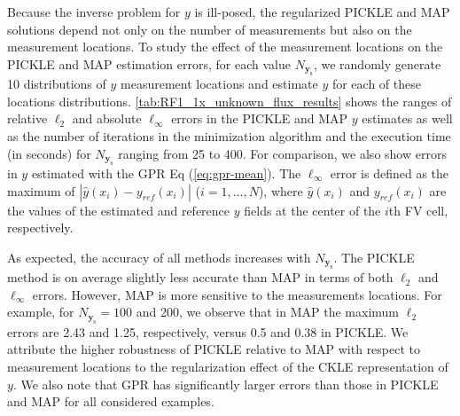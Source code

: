 \documentclass{agujournal2019}
\begin{document}
Because the inverse problem for $y$ is ill-posed, the regularized PICKLE and MAP solutions depend not only on the number of measurements but also on the measurement locations.
To study the effect of the measurement locations on the PICKLE and MAP estimation errors, for each value $N_{\mathbf{y}_\mathrm{s}}$, we randomly generate 10 distributions of $y$ measurement locations and estimate $y$ for each of these locations distributions.
\cref{tab:RF1_1x_unknown_flux_results} shows the ranges of relative $\ell_2 $ and absolute $\ell_\infty$ errors in the PICKLE and MAP $y$ estimates as well as the number of iterations in the minimization algorithm and the execution time (in seconds) for $N_{\mathbf{y}_{\mathrm{s}}}$ 
 ranging from 25 to 400.
For comparison, we also show errors in $y$ estimated with the GPR Eq (\ref{eq:gpr-mean}).
The $\ell_\infty$ error is defined as the maximum of $|\hat{y}(x_i) - y_{ref}(x_i)|$ ($i=1,\ldots,N$), where $\hat{y}(x_i)$ and $y_{ref}(x_i)$ are the values of the estimated and reference $y$ fields at the center of the $i$th FV cell, respectively.     
 
As expected, the accuracy of all methods increases with $N_{\mathbf{y}_{\mathrm{s}}}$.
The PICKLE method is on average slightly less accurate than MAP in terms of both $\ell_2$ and $\ell_\infty$ errors.
However, MAP is more sensitive to the measurements locations.
For example, for $N_{\mathbf{y}_{\mathrm{s}}} = 100$ and 200, we observe that in MAP the maximum $\ell_2$ errors are 2.43 and 1.25, respectively, versus 0.5 and 0.38 in PICKLE.
We attribute the higher robustness of PICKLE relative to MAP with respect to measurement locations to the regularization effect of the CKLE  representation of $y$.
We also note that GPR has significantly larger errors than those in PICKLE and MAP for all considered examples. 
\end{document}
